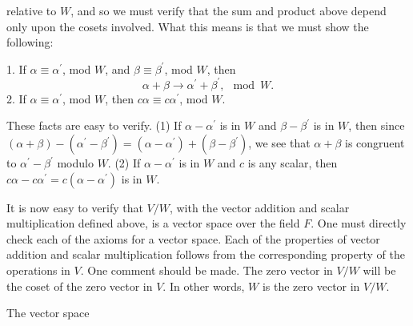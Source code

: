relative to \(W\), and so we must verify that the sum and product above depend only upon the cosets involved. What this means is that we must show the following:

1. If \(\alpha\equiv\alpha^{\prime}\), mod \(W\), and \(\beta\equiv\beta^{\prime}\), mod \(W\), then \[\alpha+\beta\rightarrow\alpha^{\prime}+\beta^{\prime},\mod W.\]
2. If \(\alpha\equiv\alpha^{\prime}\), mod \(W\), then \(c\alpha\equiv c\alpha^{\prime}\), mod \(W\).

These facts are easy to verify. (1) If \(\alpha-\alpha^{\prime}\) is in \(W\) and \(\beta-\beta^{\prime}\) is in \(W\), then since \((\alpha+\beta)-(\alpha^{\prime}-\beta^{\prime})=(\alpha-\alpha^{\prime})+( \beta-\beta^{\prime})\), we see that \(\alpha+\beta\) is congruent to \(\alpha^{\prime}-\beta^{\prime}\) modulo \(W\). (2) If \(\alpha-\alpha^{\prime}\) is in \(W\) and \(c\) is any scalar, then \(c\alpha-c\alpha^{\prime}=c(\alpha-\alpha^{\prime})\) is in \(W\).

It is now easy to verify that \(V/W\), with the vector addition and scalar multiplication defined above, is a vector space over the field \(F\). One must directly check each of the axioms for a vector space. Each of the properties of vector addition and scalar multiplication follows from the corresponding property of the operations in \(V\). One comment should be made. The zero vector in \(V/W\) will be the coset of the zero vector in \(V\). In other words, \(W\) is the zero vector in \(V/W\).

The vector space 